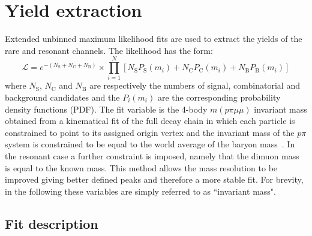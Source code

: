 \section{Yield extraction}

Extended unbinned maximum likelihood fits are used to extract the yields of the rare and resonant channels.
The likelihood has the form:
%
\begin{equation}
\mathcal{L}=e^{-(N_\mathrm{S}+N_\mathrm{C}+N_{\mathrm{B}})}\times\prod_{i=1}^{N}\left[
N_\mathrm{S}P_{\mathrm{S}}(m_i)+N_\mathrm{C}P_\mathrm{C}(m_i)+N_{\mathrm{B}}P_{\mathrm{B}}(m_i)\right]
\end{equation}
\noindent
where $N_\mathrm{S}$, $N_\mathrm{C}$ and $N_\mathrm{B}$ are respectively the numbers of signal, 
combinatorial and \KS background candidates and the $P_i(m_i)$ are the corresponding probability density functions (PDF).
The fit variable is the 4-body $m(p\pi\mu\mu)$ invariant mass obtained from
a kinematical fit of the full decay chain in which each particle is constrained to point to its
assigned origin vertex and the invariant mass of the $p\pi$ system is constrained to be equal to
the world average of the \Lz baryon mass~\cite{PDG2014}. In the resonant case a further constraint is imposed, namely 
that the dimuon mass is equal to the known \jpsi mass. This method allows the mass resolution to be improved giving
better defined peaks and therefore a more stable fit. For brevity, in the following these variables are
simply referred to as ``invariant mass".

\subsection{Fit description}
\label{sec:Lb_fit}

